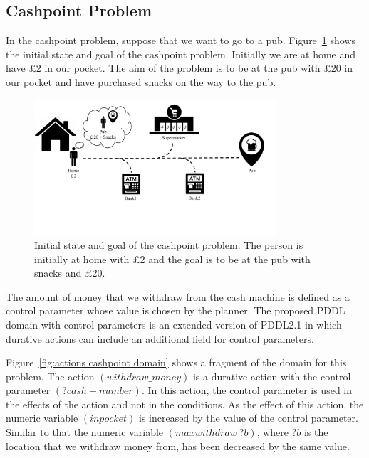 \subsection{Cashpoint Problem}

In the cashpoint problem, suppose that we want to go to a pub. Figure~\ref{fig:cashpoint} shows the initial state and goal of the cashpoint problem. Initially we are at home and have \pounds2 in our pocket. The aim of the problem is to be at the pub with \pounds20 in our pocket and have purchased snacks on the way to the pub.

\begin{figure}[!ht]
\centering
\includegraphics[width=0.80\textwidth]{diagrams/cashpoint.pdf}
\caption{Initial state and goal of the cashpoint problem. The person is initially at home with \pounds2 and the goal is to be at the pub with snacks and \pounds20.}
\label{fig:cashpoint}
\end{figure}

The amount of money that we withdraw from the cash machine is defined as a control parameter whose value is chosen by the planner. The proposed PDDL domain with control parameters is an extended version of PDDL2.1 in which durative actions can include an additional field for control parameters.

Figure~\ref{fig:actions cashpoint domain} shows a fragment of the domain for this problem. The action $(withdraw\_money)$ is a durative action with the control parameter $(?cash - number)$. In this action, the control parameter is used in the effects of the action and not in the conditions. As the effect of this action, the numeric variable $(inpocket)$ is increased by the value of the control parameter. Similar to that the numeric variable $(maxwithdraw \ ?b)$, where $?b$ is the location that we withdraw money from, has been decreased by the same value.


